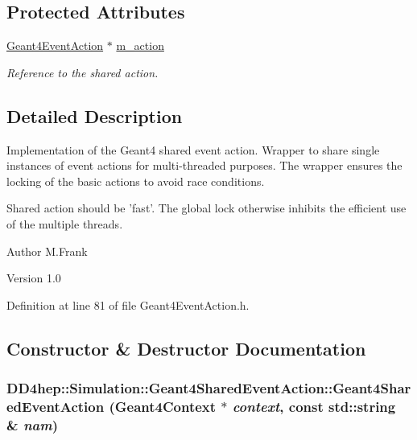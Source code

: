 \subsection*{Protected Attributes}
\begin{DoxyCompactItemize}
\item 
\hyperlink{class_d_d4hep_1_1_simulation_1_1_geant4_event_action}{Geant4EventAction} $\ast$ \hyperlink{class_d_d4hep_1_1_simulation_1_1_geant4_shared_event_action_aa79a57a0581a48e4f211acec481ada26}{m\_\-action}
\begin{DoxyCompactList}\small\item\em Reference to the shared action. \item\end{DoxyCompactList}\end{DoxyCompactItemize}


\subsection{Detailed Description}
Implementation of the Geant4 shared event action. Wrapper to share single instances of event actions for multi-\/threaded purposes. The wrapper ensures the locking of the basic actions to avoid race conditions.

Shared action should be 'fast'. The global lock otherwise inhibits the efficient use of the multiple threads.

\begin{DoxyAuthor}{Author}
M.Frank 
\end{DoxyAuthor}
\begin{DoxyVersion}{Version}
1.0 
\end{DoxyVersion}


Definition at line 81 of file Geant4EventAction.h.

\subsection{Constructor \& Destructor Documentation}
\hypertarget{class_d_d4hep_1_1_simulation_1_1_geant4_shared_event_action_a2060121b3b93e2ae9d8680d531a20b9a}{
\subsubsection[{Geant4SharedEventAction}]{\setlength{\rightskip}{0pt plus 5cm}DD4hep::Simulation::Geant4SharedEventAction::Geant4SharedEventAction ({\bf Geant4Context} $\ast$ {\em context}, \/  const std::string \& {\em nam})}}
\label{class_d_d4hep_1_1_simulation_1_1_geant4_shared_event_action_a2060121b3b93e2ae9d8680d531a20b9a}


